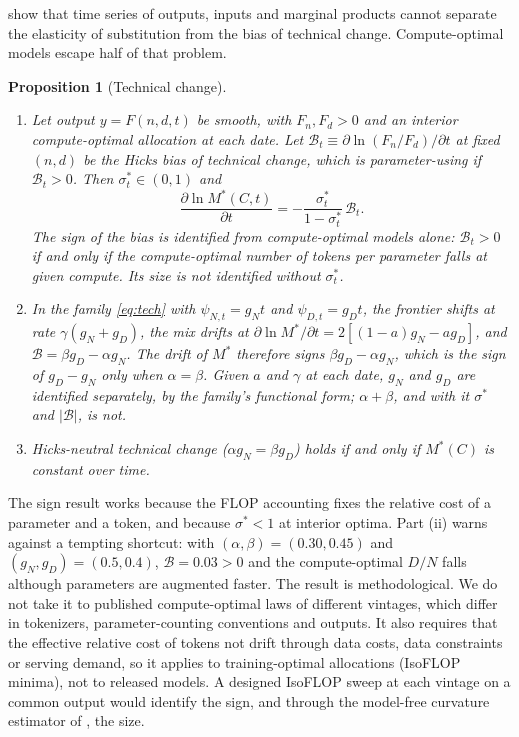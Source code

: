 \documentclass[AER,finalmode]{AEA}
\newtheorem{proposition}{Proposition}
\theoremstyle{definition}
\theoremstyle{remark}
\begin{document}
\citet{diamond1978measurement} show that time series of outputs, inputs and marginal products cannot separate the
elasticity of substitution from the bias of technical change. Compute-optimal models escape half of that problem.

\begin{proposition}[Technical change]\label{prop:dmr}
\begin{enumerate}
\item[(i)] Let output $y=F(n,d,t)$ be smooth, with $F_n,F_d>0$ and an interior compute-optimal allocation at each
date. Let $\mathcal B_t\equiv\partial\ln(F_n/F_d)/\partial t$ at fixed $(n,d)$ be the Hicks bias of technical change,
which is parameter-using if $\mathcal B_t>0$. Then $\sigma^*_t\in(0,1)$ and
\[
\frac{\partial\ln M^*(C,t)}{\partial t}=-\frac{\sigma^*_t}{1-\sigma^*_t}\,\mathcal B_t .
\]
The sign of the bias is identified from compute-optimal models alone: $\mathcal B_t>0$ if and only if the
compute-optimal number of tokens per parameter falls at given compute. Its size is not identified without $\sigma^*_t$.
\item[(ii)] In the family \eqref{eq:tech} with $\psi_{N,t}=g_Nt$ and $\psi_{D,t}=g_Dt$, the frontier shifts at rate
$\gamma(g_N+g_D)$, the mix drifts at $\partial\ln M^*/\partial t=2[(1-a)g_N-ag_D]$, and
$\mathcal B=\beta g_D-\alpha g_N$. The drift of $M^*$ therefore signs $\beta g_D-\alpha g_N$, which is the sign of
$g_D-g_N$ only when $\alpha=\beta$. Given $a$ and $\gamma$ at each date, $g_N$ and $g_D$ are identified separately, by
the family's functional form; $\alpha+\beta$, and with it $\sigma^*$ and $|\mathcal B|$, is not.
\item[(iii)] Hicks-neutral technical change ($\alpha g_N=\beta g_D$) holds if and only if $M^*(C)$ is constant over
time.
\end{enumerate}
\end{proposition}

The sign result works because the FLOP accounting fixes the relative cost of a parameter and a token, and because
$\sigma^*<1$ at interior optima. Part (ii) warns against a tempting shortcut: with $(\alpha,\beta)=(0.30,0.45)$ and
$(g_N,g_D)=(0.5,0.4)$, $\mathcal B=0.03>0$ and the compute-optimal $D/N$ falls although parameters are augmented faster.
The result is methodological. We do not take it to published compute-optimal laws of different vintages, which differ
in tokenizers, parameter-counting conventions and outputs. It also requires that the effective relative cost of tokens
not drift through data costs, data constraints or serving demand, so it applies to training-optimal allocations
(IsoFLOP minima), not to released models. A designed IsoFLOP sweep at each vintage on a common output would identify
the sign, and through the model-free curvature estimator of \citet{okar2026what}, the size.
\end{document}
